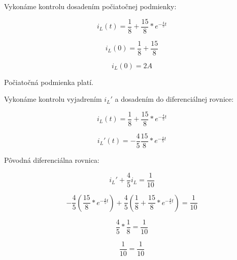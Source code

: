 \documentclass[a4paper,12pt]{article}
\begin{document}
\begin{flushleft}
Vykonáme kontrolu dosadením počiatočnej podmienky: 
\end{flushleft}

\begin{equation*}
  i_L(t) = \frac{1}{8} + \frac{15}{8}*e^{-\frac{4}{5}t}
\end{equation*}

\begin{equation*}
  i_L(0) = \frac{1}{8} + \frac{15}{8}
\end{equation*}

\begin{equation*}
  i_L(0) = 2A 
\end{equation*}

\begin{center}
Počiatočná podmienka platí.
\end{center}

\begin{flushleft}
Vykonáme kontrolu vyjadrením $i_L\prime$ a dosadením do diferenciálnej rovnice: 
\end{flushleft}

\begin{equation*}
  i_L(t) = \frac{1}{8} + \frac{15}{8}*e^{-\frac{4}{5}t}
\end{equation*}

\begin{equation*}
  i_L\prime (t) = -\frac{4}{5}\frac{15}{8}*e^{-\frac{4}{5}t}
\end{equation*}

\begin{flushleft}
Pôvodná diferenciálna rovnica:
\end{flushleft}

\begin{equation*}
  i_L\prime + \frac{4}{5}i_L = \frac{1}{10}
\end{equation*}

\begin{equation*}
  -\frac{4}{5}(\frac{15}{8}*e^{-\frac{4}{5}t}) + \frac{4}{5}(\frac{1}{8} + \frac{15}{8}*e^{-\frac{4}{5}t}) = \frac{1}{10}
\end{equation*}

\begin{equation*}
  \frac{4}{5}*\frac{1}{8} = \frac{1}{10}
\end{equation*}

\begin{equation*}
  \frac{1}{10} = \frac{1}{10}
\end{equation*}
\end{document}
